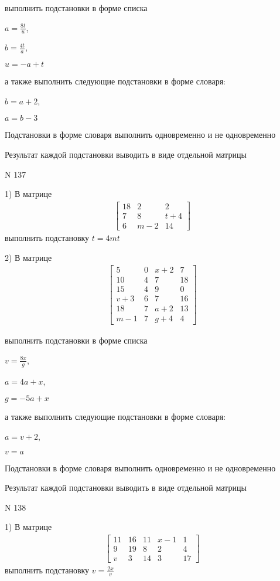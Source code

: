 \documentclass[11pt]{report}
\begin{document}
выполнить подстановки в форме списка

$a=\frac{8 t}{u}$,

$b=\frac{4 t}{a}$,

$u=- a + t$

а также выполнить следующие подстановки в форме словаря:

$b=a + 2$,

$a=b - 3$


    Подстановки в форме словаря выполнить одновременно и не одновременно


    Результат каждой подстановки выводить в виде отдельной матрицы

\newpage
N 137


    1) В матрице
\begin{align*}
\left[\begin{matrix}18 & 2 & 2\\7 & 8 & t + 4\\6 & m - 2 & 14\end{matrix}\right]
\end{align*}
выполнить подстановку $t=4 m t$


    2) В матрице
\begin{align*}
\left[\begin{matrix}5 & 0 & x + 2 & 7\\10 & 4 & 7 & 18\\15 & 4 & 9 & 0\\v + 3 & 6 & 7 & 16\\18 & 7 & a + 2 & 13\\m - 1 & 7 & g + 4 & 4\end{matrix}\right]
\end{align*}

выполнить подстановки в форме списка

$v=\frac{8 x}{g}$,

$a=4 a + x$,

$g=- 5 a + x$

а также выполнить следующие подстановки в форме словаря:

$a=v + 2$,

$v=a$


    Подстановки в форме словаря выполнить одновременно и не одновременно


    Результат каждой подстановки выводить в виде отдельной матрицы

\newpage
N 138


    1) В матрице
\begin{align*}
\left[\begin{matrix}11 & 16 & 11 & x - 1 & 1\\9 & 19 & 8 & 2 & 4\\v & 3 & 14 & 3 & 17\end{matrix}\right]
\end{align*}
выполнить подстановку $v=\frac{2 x}{v}$
\end{document}
